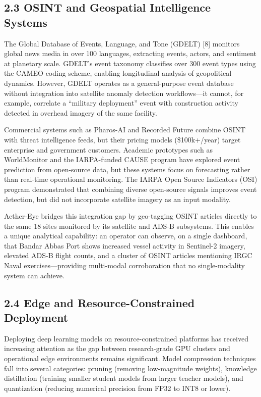 \documentclass[11pt,a4paper]{article}
\begin{document}
\hypertarget{osint-and-geospatial-intelligence-systems}{%
\subsection{2.3 OSINT and Geospatial Intelligence Systems}\label{osint-and-geospatial-intelligence-systems}}

The Global Database of Events, Language, and Tone (GDELT) [8] monitors global news media in over 100 languages, extracting events, actors, and sentiment at planetary scale. GDELT's event taxonomy classifies over 300 event types using the CAMEO coding scheme, enabling longitudinal analysis of geopolitical dynamics. However, GDELT operates as a general-purpose event database without integration into satellite anomaly detection workflows---it cannot, for example, correlate a ``military deployment'' event with construction activity detected in overhead imagery of the same facility.

Commercial systems such as Pharos-AI and Recorded Future combine OSINT with threat intelligence feeds, but their pricing models (\$100k+/year) target enterprise and government customers. Academic prototypes such as WorldMonitor and the IARPA-funded CAUSE program have explored event prediction from open-source data, but these systems focus on forecasting rather than real-time operational monitoring. The IARPA Open Source Indicators (OSI) program demonstrated that combining diverse open-source signals improves event detection, but did not incorporate satellite imagery as an input modality.

Aether-Eye bridges this integration gap by geo-tagging OSINT articles directly to the same 18 sites monitored by its satellite and ADS-B subsystems. This enables a unique analytical capability: an operator can observe, on a single dashboard, that Bandar Abbas Port shows increased vessel activity in Sentinel-2 imagery, elevated ADS-B flight counts, and a cluster of OSINT articles mentioning IRGC Naval exercises---providing multi-modal corroboration that no single-modality system can achieve.

\hypertarget{edge-and-resource-constrained-deployment}{%
\subsection{2.4 Edge and Resource-Constrained Deployment}\label{edge-and-resource-constrained-deployment}}

Deploying deep learning models on resource-constrained platforms has received increasing attention as the gap between research-grade GPU clusters and operational edge environments remains significant. Model compression techniques fall into several categories: pruning (removing low-magnitude weights), knowledge distillation (training smaller student models from larger teacher models), and quantization (reducing numerical precision from FP32 to INT8 or lower).
\end{document}
